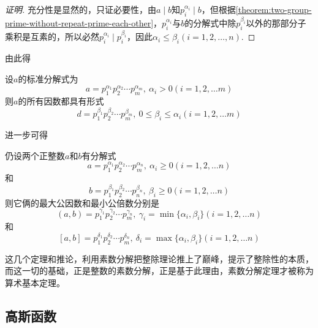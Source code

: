 \begin{proof}[证明]
  充分性是显然的，只证必要性，由$a \mid b$知$p_i^{\alpha_i} \mid b$，但根据\autoref{theorem:two-group-prime-without-repeat-prime-each-other}，$p_i^{\alpha_i}$与$b$的分解式中除$p_i^{\beta_i}$以外的那部分子乘积是互素的，所以必然$p_i^{\alpha_i} \mid p_i^{\beta_i}$，因此$\alpha_i \leqslant \beta_i(i=1,2,\ldots,n)$.
\end{proof}

由此得
\begin{inference}
  设$a$的标准分解式为
\[ a = p_1^{\alpha_1}p_2^{\alpha_2} \cdots p_m^{\alpha_m}, \  \alpha_i > 0 (i=1,2,\ldots m) \]
则$a$的所有因数都具有形式
\[ d = p_1^{\beta_1}p_2^{\beta_2} \cdots p_m^{\beta_m}, \  0 \leqslant \beta_i \leqslant \alpha_i (i=1,2,\ldots m) \]
\end{inference}

进一步可得
\begin{theorem}
  仍设两个正整数$a$和$b$有分解式
\[ a = p_1^{\alpha_1}p_2^{\alpha_2} \cdots p_m^{\alpha_n}, \  \alpha_i \geqslant 0 (i=1,2,\ldots n) \]
和
\[ b = p_1^{\beta_1}p_2^{\beta_2} \cdots p_n^{\beta_n}, \  \beta_i \geqslant 0 (i=1,2,\ldots n) \]
则它俩的最大公因数和最小公倍数分别是
\[ (a,b) = p_1^{\gamma_1}p_2^{\gamma_2} \cdots p_m^{\gamma_n}, \  \gamma_i=\min\{\alpha_i,\beta_i\} (i=1,2,\ldots n) \]
和
\[ [a,b] = p_1^{\delta_1}p_2^{\delta_2} \cdots p_m^{\delta_n}, \  \delta_i=\max\{\alpha_i,\beta_i\} (i=1,2,\ldots n) \]
\end{theorem}

这几个定理和推论，利用素数分解把整除理论推上了巅峰，提示了整除性的本质，而这一切的基础，正是整数的素数分解，正是基于此理由，素数分解定理才被称为算术基本定理。

\subsection{高斯函数}
\label{sec:gauss-function}


